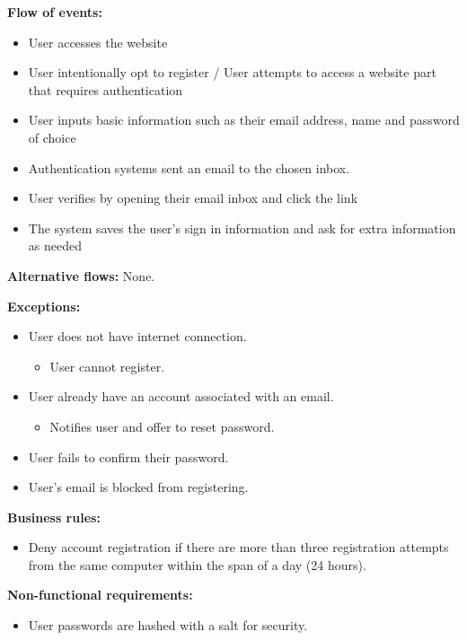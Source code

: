 \documentclass[a4paper]{article}
\begin{document}
\textbf{Flow of events:}
\begin{itemize}
    \item User accesses the website
    \item User intentionally opt to register / User attempts to access a website part that requires authentication
    \item User inputs basic information such as their email address, name and password of choice
    \item Authentication systems sent an email to the chosen inbox.
    \item User verifies by opening their email inbox and click the link
    \item The system saves the user's sign in information and ask for extra information as needed
\end{itemize}

\textbf{Alternative flows:}
None.

\textbf{Exceptions:}
\begin{itemize}
    \item User does not have internet connection.
          \begin{itemize}
              \item User cannot register.
          \end{itemize}
    \item User already have an account associated with an email.
          \begin{itemize}
              \item Notifies user and offer to reset password.
          \end{itemize}
    \item User fails to confirm their password.
    \item User's email is blocked from registering.
\end{itemize}

\textbf{Business rules:}
\begin{itemize}
    \item Deny account registration if there are more than three registration attempts from the same computer within the span of a day (24 hours).
\end{itemize}

\textbf{Non-functional requirements:}
\begin{itemize}
    \item User passwords are hashed with a salt for security.
\end{itemize}
\end{document}

